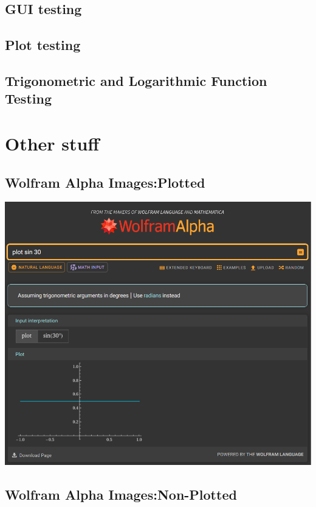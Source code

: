 \documentclass[a4paper, oneside, 11pt]{report}
\begin{document}
	\section{GUI testing}

	\section{Plot testing}

	\section{Trigonometric and Logarithmic Function Testing}


	\chapter{Other stuff}
	\section{Wolfram Alpha Images:Plotted} \label{WolframPlotted}

	\includegraphics[width=160mm]{Screenshot 2025-01-03 161746.png} \\


	\section{Wolfram Alpha Images:Non-Plotted}\label{WolframUnplotted}
\end{document}
